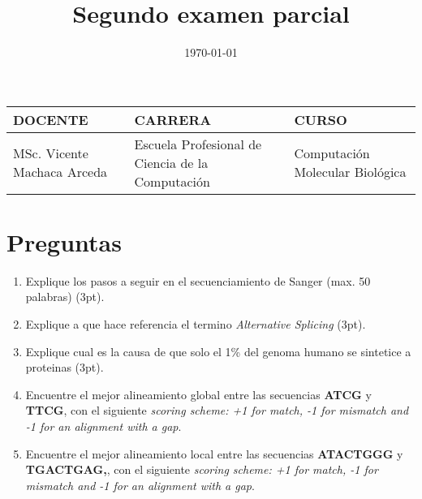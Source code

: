 \documentclass{article}
\title{\textbf{Segundo examen parcial}}
\author{\csdocente}
\date{\today}
\newcommand{\csdocente}{MSc. Vicente Machaca Arceda}
\newcommand{\cscurso}{Computación Molecular Biológica}
\newcommand{\csescuela}{Escuela Profesional de Ciencia de la Computación}
\newcommand{\cspracnr}{}
\newcommand{\cstema}{Operador exponencial}
\newcommand\BackgroundPic{%
\put(0,0){%
\parbox[b][\paperheight]{\paperwidth}{%
\vfill
\centering
\texttt{[image: ../img/background4.png]}%
\vfill
}}}
\begin{document}
	



\maketitle

\begin{table}[h]
	\begin{tabular}{|x{5cm}|x{6cm}|x{5cm}|}
		\hline 
		\textbf{DOCENTE} & \textbf{CARRERA}  & \textbf{CURSO}   \\
		\hline 
		\csdocente & \csescuela & \cscurso    \\
		\hline 
	\end{tabular}
\end{table}





\section{Preguntas}

\begin{enumerate}
	\item Explique los pasos a seguir en el secuenciamiento de Sanger (max. 50 palabras) (3pt).
	\item  Explique a que hace referencia el termino \textit{Alternative Splicing} (3pt).
	\item  Explique cual es la causa de que solo el 1\% del genoma humano se sintetice a proteinas (3pt).
	\item Encuentre el mejor alineamiento global entre las secuencias \textbf{ATCG} y \textbf{TTCG}, con el siguiente \textit{scoring scheme: +1 for match, -1 for mismatch and -1 for an alignment with a gap}.
	
	\item Encuentre el mejor alineamiento local entre las secuencias \textbf{ATACTGGG} y \textbf{TGACTGAG,}, con el siguiente \textit{scoring scheme: +1 for match, -1 for mismatch and -1 for an alignment with a gap}.
	
	
\end{enumerate}

%
%
\end{document}
